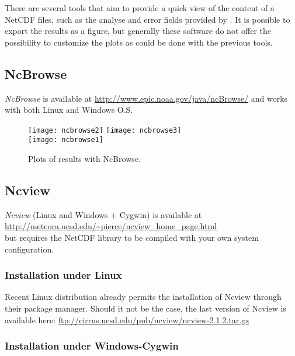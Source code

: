 There are several tools that aim to provide a quick view of the content of a NetCDF files, such as the analyse and error fields provided by \diva. It is possible to export the results as a figure, but generally these software do not offer the possibility to customize the plots as could be done with the previous tools.

\subsection{NcBrowse}


\textsl{NcBrowse} is available at \url{http://www.epic.noaa.gov/java/ncBrowse/} and works with both Linux and Windows O.S.

\begin{figure}[htpb]
\centering
\texttt{[image: ncbrowse2]}\hspace{.5cm} \texttt{[image: ncbrowse3]} \\
\vspace{.5cm}
\texttt{[image: ncbrowse1]} 
\caption{Plots of results with NcBrowse.}
\end{figure}

\subsection{Ncview}

\textsl{Ncview} (Linux and Windows + Cygwin) is available at\\
\url{http://meteora.ucsd.edu/~pierce/ncview_home_page.html}\\
but requires the NetCDF library to be compiled with your own system configuration.

\subsubsection{Installation under Linux}

Recent Linux distribution already permits the installation of Ncview through their package manager. Should it not be the case, the last version of Ncview is available here: \url{ftp://cirrus.ucsd.edu/pub/ncview/ncview-2.1.2.tar.gz}

\subsubsection{Installation under Windows-Cygwin}


